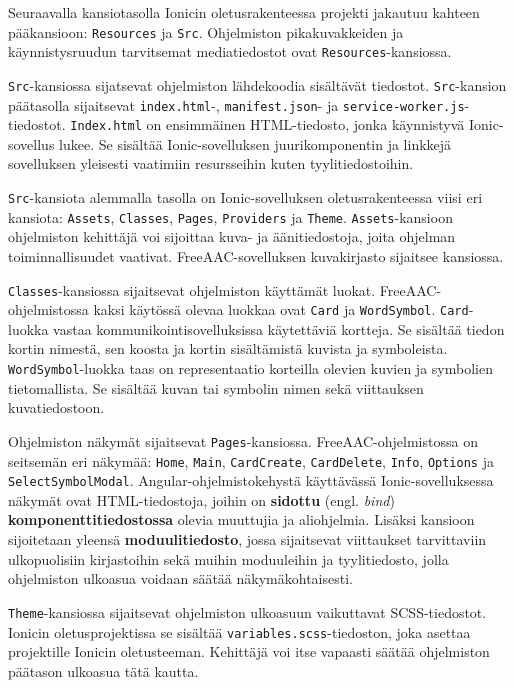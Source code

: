 \documentclass[utf8]{gradu3}
\begin{document}
Seuraavalla kansiotasolla Ionicin oletusrakenteessa projekti jakautuu kahteen pääkansioon: \texttt{Resources} ja \texttt{Src}. Ohjelmiston pikakuvakkeiden ja käynnistysruudun tarvitsemat mediatiedostot ovat \texttt{Resources}-kansiossa.

\texttt{Src}-kansiossa sijatsevat ohjelmiston lähdekoodia sisältävät tiedostot. \texttt{Src}-kansion päätasolla sijaitsevat \texttt{index.html}-, \texttt{manifest.json}- ja \texttt{service-worker.js}-tiedostot. \texttt{Index.html} on ensimmäinen HTML-tiedosto, jonka käynnistyvä Ionic-sovellus lukee. Se sisältää Ionic-sovelluksen juurikomponentin ja linkkejä sovelluksen yleisesti vaatimiin resursseihin kuten tyylitiedostoihin.

\texttt{Src}-kansiota alemmalla tasolla on Ionic-sovelluksen oletusrakenteessa viisi eri kansiota: \texttt{Assets}, \texttt{Classes}, \texttt{Pages}, \texttt{Providers} ja \texttt{Theme}. \texttt{Assets}-kansioon ohjelmiston kehittäjä voi sijoittaa kuva- ja äänitiedostoja, joita ohjelman toiminnallisuudet vaativat. FreeAAC\nobreakdash-\hspace{0pt}sovelluksen kuvakirjasto sijaitsee kansiossa.

\texttt{Classes}-kansiossa sijaitsevat ohjelmiston käyttämät luokat. FreeAAC-ohjelmistossa kaksi käytössä olevaa luokkaa ovat \texttt{Card} ja \texttt{WordSymbol}. \texttt{Card}-luokka vastaa kommunikointisovelluksissa käytettäviä kortteja. Se sisältää tiedon kortin nimestä, sen koosta ja kortin sisältämistä kuvista ja symboleista. \texttt{WordSymbol}-luokka taas on representaatio korteilla olevien kuvien ja symbolien tietomallista. Se sisältää kuvan tai symbolin nimen sekä viittauksen kuvatiedostoon.

Ohjelmiston näkymät sijaitsevat \texttt{Pages}-kansiossa. FreeAAC-ohjelmistossa on seitsemän eri näkymää: \texttt{Home}, \texttt{Main}, \texttt{CardCreate}, \texttt{CardDelete}, \texttt{Info}, \texttt{Options} ja \texttt{SelectSym\linebreak[4]bolModal}. Angular-ohjelmistokehystä käyttävässä Ionic-sovelluksessa näkymät ovat HTML-tiedostoja, joihin on \textbf{sidottu} (engl. \textit{bind}) \textbf{komponenttitiedostossa} olevia muuttujia ja aliohjelmia. Lisäksi kansioon sijoitetaan yleensä \textbf{moduulitiedosto}, jossa sijaitsevat viittaukset tarvittaviin ulkopuolisiin kirjastoihin sekä muihin moduuleihin ja tyylitiedosto, jolla ohjelmiston ulkoasua voidaan säätää näkymäkohtaisesti.

\texttt{Theme}-kansiossa sijaitsevat ohjelmiston ulkoasuun vaikuttavat SCSS-tiedostot. Ionicin oletusprojektissa se sisältää \texttt{variables.scss}-tiedoston, joka asettaa projektille Ionicin oletusteeman. Kehittäjä voi itse vapaasti säätää ohjelmiston päätason ulkoasua tätä kautta.
\end{document}
